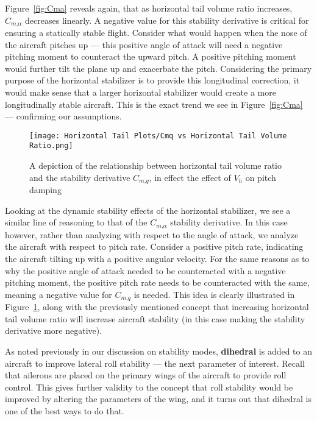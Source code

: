 \documentclass{article}
\begin{document}
Figure~\ref{fig:Cma} reveals again, that as horizontal tail volume ratio increases, $C_{m \text{,} \alpha}$ decreases linearly.
A negative value for this stability derivative is critical for ensuring a statically stable flight. 
Consider what would happen when the nose of the aircraft pitches up --- this positive angle of attack will need a negative pitching moment to counteract the upward pitch.
A positive pitching moment would further tilt the plane up and exacerbate the pitch. Considering the primary purpose of the horizontal stabilizer is to provide this longitudinal correction,
it would make sense that a larger horizontal stabilizer would create a more longitudinally stable aircraft. This is the exact trend we see in Figure~\ref{fig:Cma} --- confirming our assumptions.

\begin{figure}[H]
    \centering
    \texttt{[image: Horizontal Tail Plots/Cmq vs Horizontal Tail Volume Ratio.png]}
    \caption{A depiction of the relationship between horizontal tail volume ratio and the stability derivative $C_{m \text{,} q}$\label{fig:Cmq}, in effect the effect of $V_h$ on pitch damping}
\end{figure}
Looking at the dynamic stability effects of the horizontal stabilizer, we see a similar line of reasoning to that of the $C_{m \text{,} \alpha}$ stability derivative.
In this case however, rather than analyzing with respect to the angle of attack, we analyze the aircraft with respect to pitch rate. 
Consider a positive pitch rate, indicating the aircraft tilting up with a positive angular velocity.
For the same reasons as to why the positive angle of attack needed to be counteracted with a negative pitching moment, the positive pitch rate needs to be counteracted with the same, meaning a negative value for $C_{m \text{,} q}$ is needed.
This idea is clearly illustrated in Figure~\ref{fig:Cmq}, along with the previously mentioned concept that increasing horizontal tail volume ratio will increase aircraft stability (in this case making the stability derivative more negative).

\bigskip

As noted previously in our discussion on stability modes, \textbf{dihedral} is added to an aircraft to improve lateral roll stability --- the next parameter of interest.
Recall that ailerons are placed on the primary wings of the aircraft to provide roll control. 
This gives further validity to the concept that roll stability would be improved by altering the parameters of the wing, and it turns out that dihedral is one of the best ways to do that.
\end{document}
